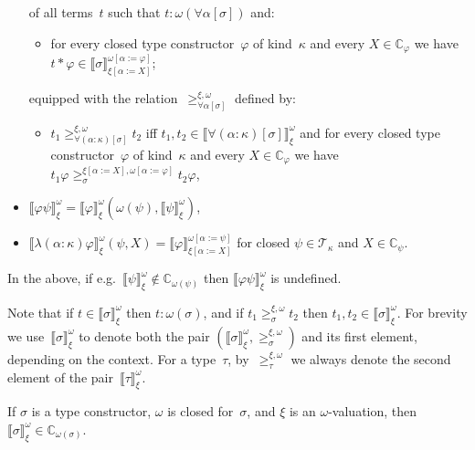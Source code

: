\documentclass[runningheads,a4paper]{llncs}
\newcommand{\tapp}[2]{#1 * #2}
\newcommand{\subst}[2]{#1:=#2}
\newcommand{\Tc}{\mathcal{T}}
\newcommand{\Cb}{\mathbb{C}}
\newcommand{\val}[3]{\ensuremath{\llbracket#1\rrbracket_{#2}^{#3}}}
\newcommand{\gteq}[3]{\ensuremath{\ge_{#1}^{#2,#3}}}
\begin{document}
\begin{definition}
\begin{itemize}
    of all terms~$t$ such that $t : \omega(\forall\alpha[\sigma])$ and:
    \begin{itemize}
    \item for every closed type constructor~$\varphi$ of kind~$\kappa$
      and every $X \in \Cb_\varphi$ we have $\tapp{t}{\varphi} \in
      \val{\sigma}{\xi[\subst{\alpha}{X}]}{\omega[\subst{\alpha}{\varphi}]}$;
    \end{itemize}
    equipped with the
    relation~$\gteq{\forall\alpha[\sigma]}{\xi}{\omega}$ defined by:
    \begin{itemize}
    \item $t_1 \gteq{\forall(\alpha:\kappa)[\sigma]}{\xi}{\omega} t_2$
      iff $t_1,t_2 \in
      \val{\forall(\alpha:\kappa)[\sigma]}{\xi}{\omega}$ and for every
      closed type constructor~$\varphi$ of kind~$\kappa$ and every $X
      \in \Cb_\varphi$ we have $t_1 \varphi
      \gteq{\sigma}{\xi[\subst{\alpha}{X}]}{\omega[\subst{\alpha}{\varphi}]}
      t_2 \varphi$,
    \end{itemize}
  \item
    $\val{\varphi \psi}{\xi}{\omega} =
    \val{\varphi}{\xi}{\omega}(\omega(\psi),\val{\psi}{\xi}{\omega})$,
  \item
    $\val{\lambda(\alpha:\kappa)\varphi}{\xi}{\omega}(\psi,X) =
    \val{\varphi}{\xi[\subst{\alpha}{X}]}{\omega[\subst{\alpha}{\psi}]}$
    for closed $\psi \in \Tc_\kappa$ and $X \in \Cb_\psi$.
  \end{itemize}
  In the above, if e.g.~$\val{\psi}{\xi}{\omega} \notin
  \Cb_{\omega(\psi)}$ then $\val{\varphi \psi}{\xi}{\omega}$ is
  undefined.
\end{definition}

Note that if $t \in \val{\sigma}{\xi}{\omega}$ then $t :
\omega(\sigma)$, and if $t_1 \gteq{\sigma}{\xi}{\omega} t_2$ then
$t_1,t_2\in\val{\sigma}{\xi}{\omega}$. For brevity we
use~$\val{\sigma}{\xi}{\omega}$ to denote both the pair
$(\val{\sigma}{\xi}{\omega},{\gteq{\sigma}{\xi}{\omega}})$ and its
first element, depending on the context. For a type~$\tau$,
by~$\gteq{\tau}{\xi}{\omega}$ we always denote the second element of
the pair~$\val{\tau}{\xi}{\omega}$.

\begin{lemma}\label{lem_val_wm_computable}
  If $\sigma$ is a type constructor, $\omega$ is closed for~$\sigma$,
  and $\xi$ is an $\omega$-valuation, then $\val{\sigma}{\xi}{\omega}
  \in \Cb_{\omega(\sigma)}$.
\end{lemma}
\end{document}
